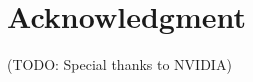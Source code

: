 \documentclass[12pt]{report}
\begin{document}
\section{Acknowledgment}
(TODO: Special thanks to NVIDIA) 












\newpage 

\nocite{*}
\end{document}
